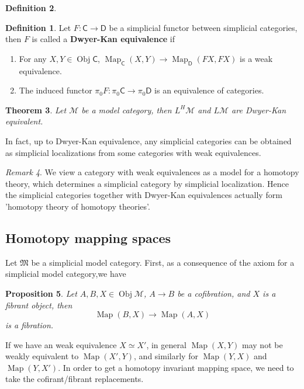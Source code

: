 \documentclass[11pt]{amsart}
\numberwithin{equation}{section}
\newtheorem{thm}{Theorem}[section]
\newtheorem{prop}[thm]{Proposition}
\theoremstyle{definition}
\newtheorem{defn}[thm]{Definition}
\theoremstyle{remark}
\newtheorem{rem}[thm]{Remark}
\numberwithin{equation}{section}
\newcommand{\CC}{{\mathsf C}}
\newcommand{\CD}{{\mathsf D}}
\newcommand{\cm}{{\mathcal{M}}}
\newcommand{\M}{{\mathfrak{M}}}
\newcommand{\ob}{\operatorname{Obj}}
\newcommand{\map}{\operatorname{Map}}
\begin{document}
\begin{defn}
	\begin{defn}
		Let $F:\CC \to \CD$ be a simplicial functor between simplicial categories, then $F$ is called a {\bf Dwyer-Kan equivalence} if 
	    \begin{enumerate}
	    	\item For any $X, Y \in \ob \CC$, $\map_{\CC}(X,Y) \to \map_{\CD}(FX,FX)$ is a weak equivalence.
	    	\item The induced functor $\pi_0 F: \pi_0 \CC \to \pi_0 \CD$ is an equivalence of categories.
	    \end{enumerate}
	\end{defn} 
\end{defn}

\begin{thm}
	Let $\cm$ be a model category, then $L^H\cm$ and $L\cm$ are Dwyer-Kan equivalent.
\end{thm}

In fact, up to Dwyer-Kan equivalence, any simplicial categories can be obtained as simplicial localizations from some categories with weak equivalences.

\begin{rem}
	We view a category with weak equivalences as a model for a homotopy theory, which determines a simplicial category by simplicial localization. Hence the simplicial categories together with Dwyer-Kan equivalences actually form 'homotopy theory of homotopy theories'.
\end{rem}

\subsection{Homotopy mapping spaces}
Let $\M$ be a simplicial model category. First, as a consequence of the axiom for a simplicial model category,we have 
\begin{prop}
	Let $A, B, X \in \ob \cm$, $A\to B$ be a cofibration, and $X$ is a fibrant object, then 
	\begin{equation*}
	\map(B,X) \to \map (A,X)
	\end{equation*}
	is a fibration.
\end{prop}

If we have an weak equivalence $X\simeq X'$, in general $\map(X,Y)$ may not be weakly equivalent to $\map (X',Y)$, and similarly for $\map(Y,X)$ and $\map (Y,X')$. In order to get a homotopy invariant mapping space, we need to take the cofirant/fibrant replacements.
\end{document}
